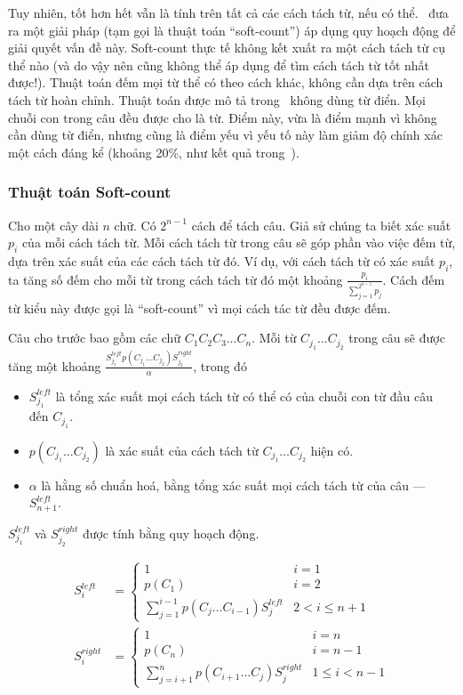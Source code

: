 \documentclass[a4paper,oneside,14pt]{extbook} %
\begin{document}
Tuy nhiên, tốt hơn hết vẫn là tính trên tất cả các cách tách từ, nếu có
thể. \cite{softcount}~đưa ra một giải pháp (tạm gọi là thuật toán
``soft-count'') áp dụng quy hoạch động để giải quyết vấn đề này.
Soft-count thực tế không kết xuất ra một cách tách từ cụ thể nào (và
do vậy nên 
cũng không thể áp dụng để tìm cách tách từ tốt nhất được!). Thuật toán
đếm mọi từ thể có theo cách khác, không cần dựa trên cách tách từ hoàn
chỉnh. Thuật toán được mô tả trong~\cite{softcount} không dùng từ điển. Mọi chuỗi con trong câu đều được
cho là từ. Điểm này, vừa là điểm mạnh vì không cần dùng từ
điển, nhưng cũng là điểm yếu vì yếu tố này làm giảm độ chính xác một
cách đáng kể (khoảng 20\%, như kết quả trong~\cite{softcount}).


\subsubsection{Thuật toán Soft-count}

Cho một cây dài $n$ chữ. Có $2^{n-1}$ cách để tách câu. Giả sử chúng
ta biết xác suất $p_i$ của mỗi cách tách từ. Mỗi cách tách từ trong
câu sẽ góp phần vào việc đếm từ, dựa trên xác suất của các cách tách
từ đó. Ví dụ, với cách tách từ có xác suất $p_i$, ta tăng số đếm cho
mỗi từ trong cách tách từ đó một khoảng
$\frac{p_i}{\sum_{j=1}^{2^{n-1}}p_j}$. Cách đếm từ kiểu
này được gọi là ``soft-count'' vì mọi cách tác từ đều được đếm. 

Câu cho trước bao gồm các chữ $C_1C_2C_3\ldots C_n$. Mỗi từ
$C_{j_1}\ldots C_{j_2}$ trong câu sẽ được tăng một khoảng
$\frac{S_{j_1}^{left}p(C_{j_1}\ldots
  C_{j_2})S_{j_2}^{right}}{\alpha}$, trong đó
\begin{itemize}
\item $S_{j_1}^{left}$ là tổng xác suất mọi cách tách từ có thể có của
  chuỗi con từ đầu câu đến $C_{j_1}$.
\item $p(C_{j_1}\ldots C_{j_2})$ là xác suất của cách tách từ
  $C_{j_1}\ldots C_{j_2}$ hiện có.
\item $\alpha$ là hằng số chuẩn hoá, bằng tổng xác suất mọi cách tách
  từ của câu --- $S_{n+1}^{left}$.
\end{itemize}

$S_{j_1}^{left}$ và $S_{j_2}^{right}$ được tính bằng quy hoạch động. 

\begin{align*}
S_i^{left} &= \left\{
    \begin{array}{ll}
      1&i=1\\
      p(C_1)&i=2\\
      \sum_{j=1}^{i-1}p(C_j\ldots C_{i-1})S_j^{left}&2<i\le n+1
    \end{array}
  \right.\\
S_i^{right} &= \left\{
    \begin{array}{ll}
      1& i=n\\
      p(C_n)& i=n-1\\
      \sum_{j=i+1}^{n}p(C_{i+1}\ldots C_j)S_j^{right}&1\le i<n-1
    \end{array}
  \right.
\end{align*}
\end{document}
